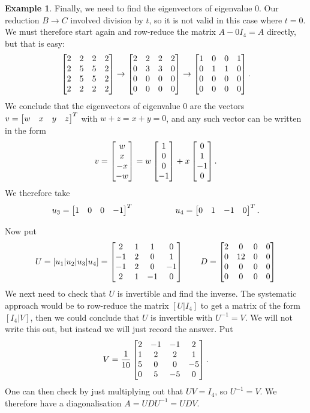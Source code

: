 \documentclass[reqno]{amsart}
\theoremstyle{definition}
\newtheorem{example}[theorem]{Example}
\begin{document}
\begin{example}
 Finally, we need to find the eigenvectors of eigenvalue $0$.  Our
 reduction $B\to C$ involved division by $t$, so it is not valid in
 this case where $t=0$.  We must therefore start again and row-reduce
 the matrix $A-0I_4=A$ directly, but that is easy:
 \[ \left[\begin{matrix} 2&2&2&2 \\ 2&5&5&2 \\ 2&5&5&2 \\ 2&2&2&2 \end{matrix}\right] \to 
    \left[\begin{matrix} 2&2&2&2 \\ 0&3&3&0 \\ 0&0&0&0 \\ 0&0&0&0 \end{matrix}\right] \to 
    \left[\begin{matrix} 1&0&0&1 \\ 0&1&1&0 \\ 0&0&0&0 \\ 0&0&0&0 \end{matrix}\right].  
 \]
 We conclude that the eigenvectors of eigenvalue $0$ are the vectors
 $v=\left[\begin{matrix} w&x&y&z\end{matrix}\right]^T$ with $w+z=x+y=0$, and any such vector can be
 written in the form
 \[ v = \left[\begin{matrix} w \\ x \\ -x \\ -w \end{matrix}\right] 
      = w \left[\begin{matrix} 1 \\ 0 \\ 0 \\ -1 \end{matrix}\right] + 
        x \left[\begin{matrix} 0 \\ 1 \\ -1 \\ 0 \end{matrix}\right].
 \]
 We therefore take 
 \[ u_3 = \left[\begin{matrix} 1&0&0&-1\end{matrix}\right]^T \hspace{5em}
    u_4 = \left[\begin{matrix} 0&1&-1&0\end{matrix}\right]^T .
 \]

 Now put 
 \[ U = [u_1|u_2|u_3|u_4] =
     \left[\begin{matrix} 
       2 & 1 &  1 &  0 \\
      -1 & 2 &  0 &  1 \\
      -1 & 2 &  0 & -1 \\
       2 & 1 & -1 &  0
     \end{matrix}\right]
     \qquad
     D = \left[\begin{matrix}
      2 & 0  & 0 & 0 \\
      0 & 12 & 0 & 0 \\
      0 & 0  & 0 & 0 \\
      0 & 0  & 0 & 0
     \end{matrix}\right]
 \]
 We next need to check that $U$ is invertible and find the inverse.
 The systematic approach would be to row-reduce the matrix $[U|I_4]$
 to get a matrix of the form $[I_4|V]$, then we could conclude that
 $U$ is invertible with $U^{-1}=V$.  We will not write this out, but
 instead we will just record the answer.  Put
 \[ V = \frac{1}{10} \left[\begin{matrix}
         2 & -1 & -1 &  2 \\
         1 &  2 &  2 &  1 \\
         5 &  0 &  0 & -5 \\
         0 &  5 & -5 &  0
        \end{matrix}\right].
 \] 
 One can then check by just multiplying out that $UV=I_4$, so
 $U^{-1}=V$.  We therefore have a diagonalisation $A=UDU^{-1}=UDV$.
\end{example}
\end{document}
